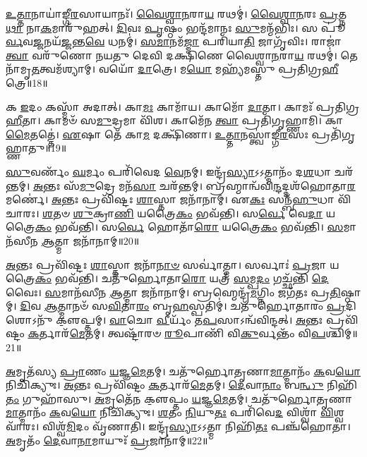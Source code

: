 \-\ul{𑌉}\-\-\ul{𑌤𑍍𑌤𑌾}\-𑌨𑌾𑌯𑌾॑𑌙𑍍𑌗𑍀\-\ul{𑌰}\-𑌸𑌾𑌯𑌾𑌨𑌃᳴। 
\-\ul{𑌵𑍈}\-\-\ul{𑌶𑍍𑌵𑌾}\-\-\ul{𑌨}\-𑌰𑌾\-\ul{𑌯} 𑌰𑌥𑌮𑍍॑। 
\-\ul{𑌵𑍈}\-\-\ul{𑌶𑍍𑌵𑌾}\-\-\ul{𑌨}\-𑌰𑌃 \ul{𑌪𑍍𑌰}\-𑌤𑍍𑌨\-\ul{𑌥𑌾} 𑌨𑌾\-\ul{𑌕}\-𑌮𑌾𑌰𑍁᳴𑌹𑌤𑍍। 
\-\ul{𑌦𑌿}\-𑌵𑌃 \ul{𑌪𑍃}\-𑌷𑍍𑌠𑌂 𑌭𑌨𑍍𑌦᳴𑌮𑌾𑌨𑌃 \ul{𑌸𑍁}\-𑌮𑌨𑍍𑌮᳴𑌭𑌿𑌃। 
𑌸 𑌪𑍂॑\-\ul{𑌰𑍍𑌵}\-𑌵\-\ul{𑌜𑍍𑌜}\-𑌨𑌯᳴\-\ul{𑌜𑍍𑌜}\-𑌨𑍍𑌤\-\ul{𑌵𑍇} 𑌧𑌨𑌮𑍍॑। 
\-\ul{𑌸}\-\-\ul{𑌮𑌾}\-𑌨𑌮᳴\-\ul{𑌜𑍍𑌮𑌾} 𑌪𑌰𑌿᳴𑌯𑌾\-\ul{𑌤𑌿} 𑌜𑌾𑌗𑍃᳴𑌵𑌿𑌃। 
𑌰𑌾𑌜𑌾॑ \ul{𑌤𑍍𑌵𑌾} 𑌵𑌰𑍁᳴𑌣𑍋 𑌨𑌯𑌤𑍁 𑌦𑍇𑌵𑌿 𑌦𑌕𑍍𑌷𑌿𑌣𑍇 𑌵𑍈𑌶𑍍𑌵𑌾\-\ul{𑌨}\-𑌰𑌾\-\ul{𑌯} 𑌰𑌥𑌮𑍍॑। 
𑌤𑍇𑌨𑌾᳴𑌮𑍃\-\ul{𑌤}\-𑌤𑍍𑌵𑌮᳴𑌶𑍍𑌯𑌾𑌮𑍍। 
𑌵𑌯𑍋᳴ \ul{𑌦𑌾}\-𑌤𑍍𑌰𑍇। 
𑌮\-\ul{𑌯𑍋} 𑌮𑌹𑍍𑌯᳴𑌮𑌸𑍍𑌤𑍁 𑌪𑍍𑌰𑌤𑌿𑌗𑍍𑌰\-\ul{𑌹𑍀}\-𑌤𑍍𑌰𑍇॥18॥

𑌕 \ul{𑌇}\-𑌦𑌂 𑌕𑌸𑍍𑌮𑌾᳴ 𑌅𑌦𑌾𑌤𑍍। 
𑌕𑌾\-\ul{𑌮𑌃} 𑌕𑌾𑌮𑌾᳴𑌯। 
𑌕𑌾𑌮𑍋᳴ \ul{𑌦𑌾}\-𑌤𑌾। 
𑌕𑌾𑌮𑌃᳴ 𑌪𑍍𑌰𑌤𑌿𑌗𑍍𑌰\-\ul{𑌹𑍀}\-𑌤𑌾। 
𑌕𑌾𑌮𑍞᳴ 𑌸\-\ul{𑌮𑍁}\-𑌦𑍍𑌰𑌮𑌾 𑌵𑌿᳴𑌶। 
𑌕𑌾𑌮𑍇᳴𑌨 \ul{𑌤𑍍𑌵𑌾} 𑌪𑍍𑌰𑌤𑌿᳴𑌗𑍃𑌹𑍍𑌣𑌾𑌮𑌿। 
𑌕𑌾\-\ul{𑌮𑍈}\-𑌤𑌤𑍍𑌤𑍇॑। 
\-\ul{𑌏}\-𑌷𑌾 𑌤𑍇᳴ 𑌕𑌾\-\ul{𑌮} 𑌦𑌕𑍍𑌷𑌿᳴𑌣𑌾। 
\-\ul{𑌉}\-\-\ul{𑌤𑍍𑌤𑌾}\-𑌨𑌸𑍍𑌤𑍍𑌵𑌾॑𑌙𑍍𑌗𑍀\-\ul{𑌰}\-𑌸𑌃 𑌪𑍍𑌰𑌤𑌿᳴𑌗𑍃𑌹𑍍𑌣𑌾𑌤𑍁॥19॥
\anuvakamend[\-\ul{𑌦𑌾}\-𑌤𑌾 𑌪𑍁𑌰𑍁᳴\-\ul{𑌷}\-𑌮𑌪𑌃᳴ 𑌪𑍍𑌰𑌤𑌿𑌗𑍍𑌰\-\ul{𑌹𑍀}\-𑌤𑍍𑌰𑍇 𑌨𑌵᳴ 𑌚]

\-\ul{𑌸𑍁}\-𑌵𑌰𑍍𑌣𑌂᳴ \ul{𑌘}\-𑌰𑍍𑌮𑌂 𑌪𑌰𑌿᳴𑌵𑍇𑌦 \ul{𑌵𑍇}\-𑌨𑌮𑍍। 
𑌇𑌨𑍍𑌦𑍍𑌰᳴\-\ul{𑌸𑍍𑌯𑌾}\-𑌽𑌽𑌤𑍍𑌮𑌾𑌨𑌂᳴ 𑌦\-\ul{𑌶}\-𑌧𑌾 𑌚𑌰᳴𑌨𑍍𑌤𑌮𑍍। 
\-\ul{𑌅}\-𑌨𑍍𑌤𑌃 𑌸᳴\-\ul{𑌮𑍁}\-𑌦𑍍𑌰𑍇 𑌮𑌨᳴\-\ul{𑌸𑌾} 𑌚𑌰᳴𑌨𑍍𑌤𑌮𑍍। 
𑌬𑍍𑌰𑌹𑍍𑌮𑌾𑌨𑍍𑌵᳴𑌵𑌿\-\ul{𑌨𑍍𑌦}\-𑌦𑍍𑌦𑌶᳴𑌹𑍋𑌤𑌾\-\ul{𑌰}\-𑌮𑌰𑍍𑌣𑍇॑। 
\-\ul{𑌅}\-𑌨𑍍𑌤𑌃 𑌪𑍍𑌰𑌵𑌿᳴𑌷𑍍𑌟𑌃  \ul{𑌶𑌾}\-𑌸𑍍𑌤𑌾 𑌜𑌨𑌾᳴𑌨𑌾𑌮𑍍। 
𑌏\-\ul{𑌕𑌃} 𑌸𑌨𑍍𑌬᳴\-\ul{𑌹𑍁}\-𑌧𑌾 𑌵𑌿᳴𑌚𑌾𑌰𑌃। 
\-\ul{𑌶}\-𑌤𑍞 \ul{𑌶𑍁}\-𑌕𑍍𑌰𑌾\-\ul{𑌣𑌿} 𑌯𑌤𑍍𑌰𑍈\-\ul{𑌕𑌂} 𑌭𑌵᳴𑌨𑍍𑌤𑌿। 
𑌸\-\ul{𑌰𑍍𑌵𑍇} 𑌵𑍇\-\ul{𑌦𑌾} 𑌯𑌤𑍍𑌰𑍈\-\ul{𑌕𑌂} 𑌭𑌵᳴𑌨𑍍𑌤𑌿। 
𑌸\-\ul{𑌰𑍍𑌵𑍇} 𑌹𑍋𑌤𑌾᳴\-\ul{𑌰𑍋} 𑌯𑌤𑍍𑌰𑍈\-\ul{𑌕𑌂} 𑌭𑌵᳴𑌨𑍍𑌤𑌿। 
\-\ul{𑌸}\-𑌮𑌾𑌨᳴𑌸𑍀𑌨 \ul{𑌆}\-𑌤𑍍𑌮𑌾 𑌜𑌨𑌾᳴𑌨𑌾𑌮𑍍॥20॥%

\-\ul{𑌅}\-𑌨𑍍𑌤𑌃 𑌪𑍍𑌰𑌵𑌿᳴𑌷𑍍𑌟𑌃  \ul{𑌶𑌾}\-𑌸𑍍𑌤𑌾 𑌜𑌨𑌾᳴\-\ul{𑌨𑌾}\-\-\ul{𑍞} 𑌸𑌰𑍍𑌵𑌾॑𑌤𑍍𑌮𑌾। 
𑌸𑌰𑍍𑌵𑌾𑌃॑ \ul{𑌪𑍍𑌰}\-𑌜𑌾 𑌯𑌤𑍍𑌰𑍈\-\ul{𑌕𑌂} 𑌭𑌵᳴𑌨𑍍𑌤𑌿। 
𑌚𑌤𑍁᳴𑌰𑍍\mbox{}𑌹𑍋𑌤𑌾\-\ul{𑌰𑍋} 𑌯𑌤𑍍𑌰᳴ \ul{𑌸}\-𑌮𑍍𑌪\-\ul{𑌦𑌂} 𑌗𑌚𑍍𑌛᳴𑌨𑍍𑌤𑌿 \ul{𑌦𑍇}\-𑌵𑍈𑌃। 
\-\ul{𑌸}\-𑌮𑌾𑌨᳴𑌸𑍀𑌨 \ul{𑌆}\-𑌤𑍍𑌮𑌾 𑌜𑌨𑌾᳴𑌨𑌾𑌮𑍍। 
𑌬𑍍𑌰𑌹𑍍𑌮𑍇𑌨𑍍𑌦𑍍𑌰᳴\-\ul{𑌮}\-𑌗𑍍𑌨𑌿𑌂 𑌜𑌗᳴𑌤𑌃 𑌪𑍍𑌰\-\ul{𑌤𑌿}\-𑌷𑍍𑌠𑌾𑌮𑍍। 
\-\ul{𑌦𑌿}\-𑌵 \ul{𑌆}\-𑌤𑍍𑌮𑌾𑌨𑍞᳴ 𑌸\-\ul{𑌵𑌿}\-𑌤𑌾\-\ul{𑌰𑌂} 𑌬𑍃\-\ul{𑌹}\-𑌸𑍍𑌪𑌤𑌿𑌮𑍍॑। 
𑌚𑌤𑍁᳴𑌰𑍍\mbox{}𑌹𑍋𑌤𑌾𑌰𑌂 \ul{𑌪𑍍𑌰}\-𑌦𑌿𑌶𑍋𑌽𑌨𑍁᳴ 𑌕𑍢॒𑌪𑍍𑌤𑌮𑍍। 
\-\ul{𑌵𑌾}\-𑌚𑍋 \ul{𑌵𑍀}\-𑌰𑍍𑌯𑌂᳴ 𑌤\-\ul{𑌪}\-𑌸𑌾𑌽𑌨𑍍𑌵᳴𑌵𑌿𑌨𑍍𑌦𑌤𑍍। 
\-\ul{𑌅}\-𑌨𑍍𑌤𑌃 𑌪𑍍𑌰𑌵𑌿᳴𑌷𑍍𑌟𑌂 \ul{𑌕}\-𑌰𑍍𑌤𑌾𑌰᳴\-\ul{𑌮𑍇}\-𑌤𑌮𑍍। 
𑌤𑍍𑌵𑌷𑍍𑌟𑌾᳴𑌰𑍞 \ul{𑌰𑍂}\-𑌪𑌾𑌣𑌿᳴ 𑌵𑌿\-\ul{𑌕𑍁}\-𑌰𑍍𑌵𑌨𑍍𑌤𑌂᳴ 𑌵𑌿\-\ul{𑌪}\-𑌶𑍍𑌚𑌿𑌮𑍍॥21॥

\-\ul{𑌅}\-𑌮𑍃𑌤᳴𑌸𑍍𑌯 \ul{𑌪𑍍𑌰𑌾}\-𑌣𑌂 \ul{𑌯}\-𑌜𑍍𑌞\-\ul{𑌮𑍇}\-𑌤𑌮𑍍। 
𑌚𑌤𑍁᳴𑌰𑍍\mbox{}𑌹𑍋𑌤𑍃𑌣𑌾\-\ul{𑌮𑌾}\-𑌤𑍍𑌮𑌾𑌨𑌂᳴ \ul{𑌕}\-𑌵\-\ul{𑌯𑍋} 𑌨𑌿𑌚𑌿᳴𑌕𑍍𑌯𑍁𑌃। 
\-\ul{𑌅}\-𑌨𑍍𑌤𑌃 𑌪𑍍𑌰𑌵𑌿᳴𑌷𑍍𑌟𑌂 \ul{𑌕}\-𑌰𑍍𑌤𑌾𑌰᳴\-\ul{𑌮𑍇}\-𑌤𑌮𑍍। 
\-\ul{𑌦𑍇}\-𑌵𑌾\-\ul{𑌨𑌾𑌂} 𑌬\-\ul{𑌨𑍍𑌧𑍁} 𑌨𑌿𑌹𑌿᳴\-\ul{𑌤𑌂} 𑌗𑍁𑌹𑌾᳴𑌸𑍁। 
\-\ul{𑌅}\-𑌮𑍃𑌤𑍇᳴𑌨 𑌕𑍢॒𑌪𑍍𑌤𑌂 \ul{𑌯}\-𑌜𑍍𑌞\-\ul{𑌮𑍇}\-𑌤𑌮𑍍। 
𑌚𑌤𑍁᳴𑌰𑍍\mbox{}𑌹𑍋𑌤𑍃𑌣𑌾\-\ul{𑌮𑌾}\-𑌤𑍍𑌮𑌾𑌨𑌂᳴ \ul{𑌕}\-𑌵\-\ul{𑌯𑍋} 𑌨𑌿𑌚𑌿᳴𑌕𑍍𑌯𑍁𑌃। 
\-\ul{𑌶}\-𑌤𑌂 \ul{𑌨𑌿}\-𑌯𑍁\-\ul{𑌤𑌃} 𑌪𑌰𑌿᳴𑌵𑍇\-\ul{𑌦} 𑌵𑌿𑌶𑍍𑌵𑌾᳴ \ul{𑌵𑌿}\-𑌶𑍍𑌵𑌵𑌾᳴𑌰𑌃। 
𑌵𑌿𑌶𑍍𑌵᳴\-\ul{𑌮𑌿}\-𑌦𑌂 𑌵𑍃᳴𑌣𑌾𑌤𑌿। 
𑌇𑌨𑍍𑌦𑍍𑌰᳴\-\ul{𑌸𑍍𑌯𑌾}\-𑌽𑌽𑌤𑍍𑌮𑌾 𑌨𑌿𑌹𑌿᳴\-\ul{𑌤𑌃} 𑌪𑌞𑍍𑌚᳴𑌹𑍋𑌤𑌾। 
\-\ul{𑌅}\-𑌮𑍃𑌤𑌂᳴ \ul{𑌦𑍇}\-𑌵𑌾\-\ul{𑌨𑌾}\-𑌮𑌾𑌯𑍁𑌃᳴ \ul{𑌪𑍍𑌰}\-𑌜𑌾𑌨𑌾॑𑌮𑍍॥22॥%

